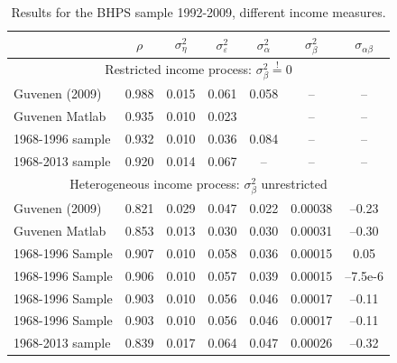 \begin{table}%
\begin{tabular}{l|cccccc}
                    &$\rho$ & $\sigma^2_{\eta}$&$\sigma^2_{\varepsilon}$&$\sigma^2_{\alpha}$&$\sigma^2_{\beta}$&$\sigma_{\alpha \beta}$\\
\hline
\hline 
\multicolumn{7}{c}{Restricted income process: $\sigma^2_{\beta} \stackrel{!}{=} 0$} \\
Guvenen (2009)   & 0.988 &  0.015           &   0.061                &       0.058       &        --        &        --             \\
Guvenen Matlab   & 0.935 &  0.010           &   0.023                &                   &        --        &        --             \\
1968-1996 sample & 0.932 &  0.010           &   0.036                &       0.084       &        --        &        --             \\
1968-2013 sample & 0.920 &  0.014           &   0.067                &       --          &        --        &        --             \\
\hline
\multicolumn{7}{c}{Heterogeneous income process: $\sigma^2_{\beta}$ unrestricted} \\
\hline
Guvenen (2009)   & 0.821 &  0.029           &   0.047                &   0.022           &     0.00038      &     --0.23            \\
Guvenen Matlab   & 0.853 &  0.013           &   0.030                &   0.030           &     0.00031      &     --0.30            \\
1968-1996 Sample & 0.907 &  0.010           &   0.058                &   0.036           &     0.00015      &       0.05            \\
1968-1996 Sample & 0.906 &  0.010           &   0.057                &   0.039           &     0.00015      &     --7.5e-6          \\
1968-1996 Sample & 0.903 &  0.010           &   0.056                &   0.046           &     0.00017      &     --0.11            \\
1968-1996 Sample & 0.903 &  0.010           &   0.056                &   0.046           &     0.00017      &     --0.11            \\
1968-2013 sample & 0.839 &  0.017           &   0.064                &   0.047           &     0.00026      &     --0.32            \\
\hline
\end{tabular}
\caption{Results for the BHPS sample 1992-2009, different income measures.}
\label{BHPS_results}
\end{table}
